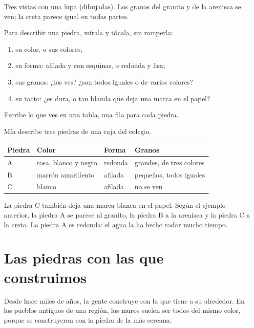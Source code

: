 \begin{omfigure}
{\small Tres  vistas con una lupa (dibujadas). Los granos del granito y
de la arenisca se ven; la creta parece igual en todas partes.}
\label{fig:g3:stones-pebbles-sand:magnified}
\end{omfigure}

\begin{method}\label{met:g3:stones-pebbles-sand:look}
Para describir una piedra, mírala y tócala, sin romperla:
\begin{enumerate}
  \item su color, o sus colores;
  \item su forma: afilada y con esquinas, o redonda y lisa;
  \item sus granos: ¿los ves? ¿son todos iguales o de varios colores?
  \item su tacto: ¿es dura, o tan blanda que deja una marca en el papel?
\end{enumerate}
Escribe lo que ves en una tabla, una fila para cada piedra.
\end{method}

\begin{example}\label{ex:g3:stones-pebbles-sand:table}
Mía describe tres piedras de una caja del colegio.
\begin{center}\small
\begin{tabular}{llll}
\hline
Piedra & Color & Forma & Granos \\
\hline
A & rosa, blanco y negro & redonda & grandes, de tres colores \\
B & marrón amarillento & afilada & pequeños, todos iguales \\
C & blanco & afilada & no se ven \\
\hline
\end{tabular}
\end{center}
La piedra C también deja una marca blanca en el papel. Según el ejemplo
anterior, la piedra A se parece al granito, la piedra B a la arenisca y la
piedra C a la creta. La piedra A es redonda: el agua la ha hecho rodar
mucho tiempo.
\end{example}

\section{Las piedras con las que construimos}

Desde hace miles de años, la gente construye con la  que tiene a su
alrededor. En los pueblos antiguos de una región, los muros suelen ser
todos del mismo color, porque se construyeron con la piedra de la 
más cercana.

